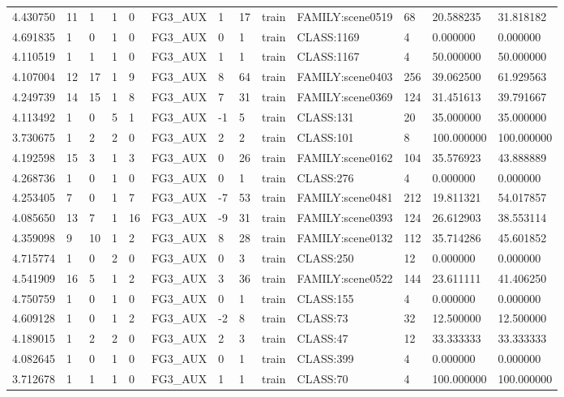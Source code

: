 \begin{tabular}{lllllllllllll}
4.430750 & 11 & 1 & 1 & 0 & FG3\_AUX & 1 & 17 & train & FAMILY:scene0519 & 68 & 20.588235 & 31.818182 \\
4.691835 & 1 & 0 & 1 & 0 & FG3\_AUX & 0 & 1 & train & CLASS:1169 & 4 & 0.000000 & 0.000000 \\
4.110519 & 1 & 1 & 1 & 0 & FG3\_AUX & 1 & 1 & train & CLASS:1167 & 4 & 50.000000 & 50.000000 \\
4.107004 & 12 & 17 & 1 & 9 & FG3\_AUX & 8 & 64 & train & FAMILY:scene0403 & 256 & 39.062500 & 61.929563 \\
4.249739 & 14 & 15 & 1 & 8 & FG3\_AUX & 7 & 31 & train & FAMILY:scene0369 & 124 & 31.451613 & 39.791667 \\
4.113492 & 1 & 0 & 5 & 1 & FG3\_AUX & -1 & 5 & train & CLASS:131 & 20 & 35.000000 & 35.000000 \\
3.730675 & 1 & 2 & 2 & 0 & FG3\_AUX & 2 & 2 & train & CLASS:101 & 8 & 100.000000 & 100.000000 \\
4.192598 & 15 & 3 & 1 & 3 & FG3\_AUX & 0 & 26 & train & FAMILY:scene0162 & 104 & 35.576923 & 43.888889 \\
4.268736 & 1 & 0 & 1 & 0 & FG3\_AUX & 0 & 1 & train & CLASS:276 & 4 & 0.000000 & 0.000000 \\
4.253405 & 7 & 0 & 1 & 7 & FG3\_AUX & -7 & 53 & train & FAMILY:scene0481 & 212 & 19.811321 & 54.017857 \\
4.085650 & 13 & 7 & 1 & 16 & FG3\_AUX & -9 & 31 & train & FAMILY:scene0393 & 124 & 26.612903 & 38.553114 \\
4.359098 & 9 & 10 & 1 & 2 & FG3\_AUX & 8 & 28 & train & FAMILY:scene0132 & 112 & 35.714286 & 45.601852 \\
4.715774 & 1 & 0 & 2 & 0 & FG3\_AUX & 0 & 3 & train & CLASS:250 & 12 & 0.000000 & 0.000000 \\
4.541909 & 16 & 5 & 1 & 2 & FG3\_AUX & 3 & 36 & train & FAMILY:scene0522 & 144 & 23.611111 & 41.406250 \\
4.750759 & 1 & 0 & 1 & 0 & FG3\_AUX & 0 & 1 & train & CLASS:155 & 4 & 0.000000 & 0.000000 \\
4.609128 & 1 & 0 & 1 & 2 & FG3\_AUX & -2 & 8 & train & CLASS:73 & 32 & 12.500000 & 12.500000 \\
4.189015 & 1 & 2 & 2 & 0 & FG3\_AUX & 2 & 3 & train & CLASS:47 & 12 & 33.333333 & 33.333333 \\
4.082645 & 1 & 0 & 1 & 0 & FG3\_AUX & 0 & 1 & train & CLASS:399 & 4 & 0.000000 & 0.000000 \\
3.712678 & 1 & 1 & 1 & 0 & FG3\_AUX & 1 & 1 & train & CLASS:70 & 4 & 100.000000 & 100.000000 \\

\end{tabular}
